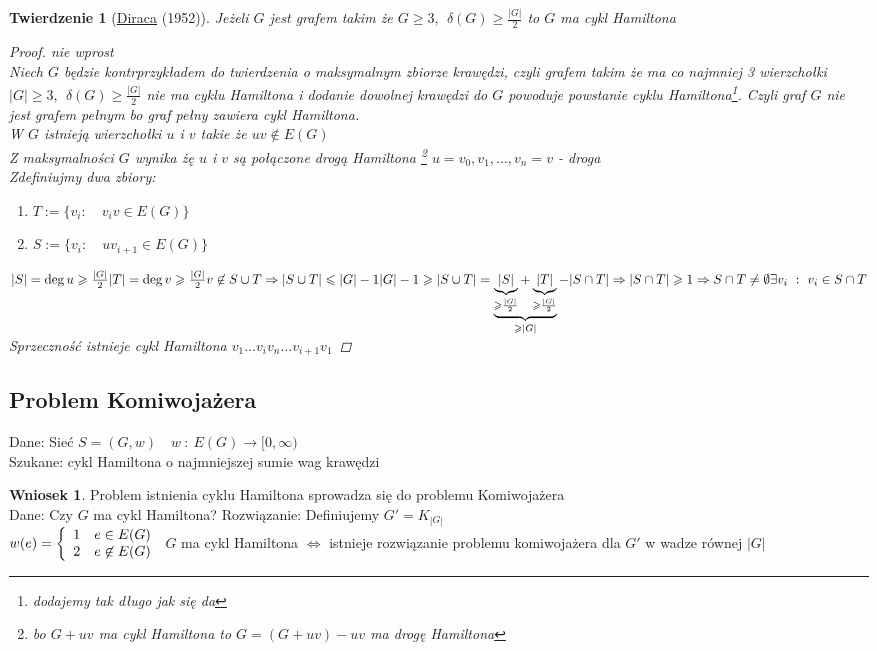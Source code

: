 \documentclass[12pt,a4paper]{article}
\newtheorem{tw}{Twierdzenie}
\theoremstyle{definition}
\newtheorem{wniosek}{Wniosek}
\newcommand{\egz}{\marginpar{\color{red} EGZAMIN}} %
\begin{document}
\begin{tw}[\href{http://pl.wikipedia.org/wiki/Gabriel_Andrew_Dirac}{Diraca} (1952)]\egz
Jeżeli $G$ jest grafem takim że $G\geqslant 3, ~~ \delta(G)\geqslant \frac{|G|}{2}$ to $G$ ma cykl Hamiltona
\begin{proof}\emph{nie wprost}\\
Niech $G$ będzie kontrprzykładem do twierdzenia o maksymalnym zbiorze krawędzi, czyli grafem takim że ma co najmniej 3 wierzchołki $|G|\geqslant 3, ~~ \delta(G) \geqslant \frac{|G|}{2}$ nie ma cyklu Hamiltona i dodanie dowolnej krawędzi do $G$ powoduje powstanie cyklu Hamiltona\footnote{dodajemy tak długo jak się da}. Czyli graf $G$ nie jest grafem pełnym bo graf pełny zawiera cykl Hamiltona.\\
W $G$ istnieją wierzchołki $u$ i $v$ takie że $uv\not\in E(G)$\\
Z maksymalności $G$ wynika żę $u$ i $v$ są połączone drogą Hamiltona \footnote{bo $G+uv$ ma cykl Hamiltona to $G=(G+uv)-uv$ ma drogę Hamiltona} $u = v_0,v_1,\dots, v_n = v$ - droga\\
Zdefiniujmy dwa zbiory:
	\begin{enumerate}
		\item $T := \{ v_i: \quad v_iv\in E(G)\}$
		\item $S := \{ v_i: \quad uv_{i+1} \in E(G)\}$
	\end{enumerate}
\begin{math}
|S| = \deg u \geqslant \frac{|G|}{2}\\
|T| = \deg v \geqslant \frac{|G|}{2}\\
v \not\in S \cup T \Rightarrow |S \cup T| \leqslant |G| -1\\
|G|-1 \geqslant |S \cup T| = \underbrace{\underbrace{|S|}_{\geqslant\frac{|G|}{2}} + \underbrace{|T|}_{\geqslant\frac{|G|}{2}}}_{\geqslant |G|} - |S \cap T| \Rightarrow |S\cap T| \geqslant 1 \Rightarrow S \cap T \neq \emptyset \\
\exists v_i ~:~ v_i \in S \cap T 
\end{math}
Sprzeczność istnieje cykl Hamiltona $v_1\dots v_iv_n\dots v_{i+1}v_1$
\end{proof}
\end{tw}

\subsection{Problem Komiwojażera}
Dane: Sieć $S = (G, w)\quad w~:~E(G)\to [0, \infty)$\\
Szukane: cykl Hamiltona o najmniejszej sumie wag krawędzi
\begin{wniosek}
Problem istnienia cyklu Hamiltona sprowadza się do problemu Komiwojażera\\
Dane: Czy $G$ ma cykl Hamiltona?
Rozwiązanie: Definiujemy $G' = K_{|G|}$\\
$w(e) = \left\lbrace
	\begin{array}{l l}
		1 & e\in E(G)\\
		2 & e\not\in E(G)
	\end{array}\right.
$
$G$ ma cykl Hamiltona $\Leftrightarrow$ istnieje rozwiązanie problemu komiwojażera dla $G'$ w wadze równej $|G|$
\end{wniosek}
\end{document}
